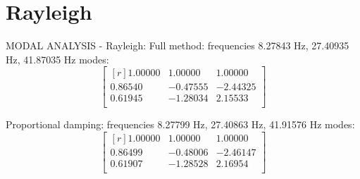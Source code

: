 \section{Rayleigh}
\label{sec:ray}
MODAL ANALYSIS - Rayleigh:
Full method:
 frequencies 8.27843 \si{\hertz}, 27.40935 \si{\hertz}, 41.87035 \si{\hertz}
 modes:
 \begin{equation}
\label{eq:raymodefree}
 \begin{bmatrix*}[r]
	1.00000 & 1.00000 & 1.00000 \\
	0.86540 &-0.47555 &-2.44325 \\
	0.61945 &-1.28034 & 2.15533 \\
 \end{bmatrix*}
\end{equation}

Proportional damping:
 frequencies 8.27799 \si{\hertz}, 27.40863 \si{\hertz}, 41.91576 \si{\hertz}
 modes:
 \begin{equation}
\label{eq:raymodeprop}
 \begin{bmatrix*}[r]
	1.00000 & 1.00000 & 1.00000 \\
	0.86499 &-0.48006 &-2.46147 \\
	0.61907 &-1.28528 & 2.16954 \\
	 \end{bmatrix*}
\end{equation}
%
